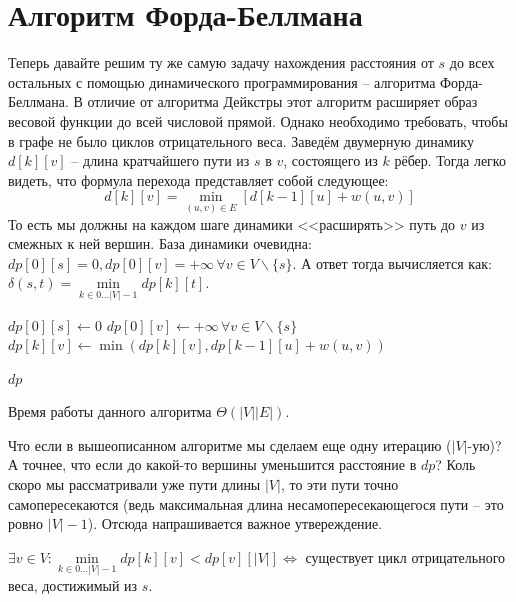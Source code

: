 \section{Алгоритм Форда-Беллмана}

Теперь давайте решим ту же самую задачу нахождения расстояния от $s$ до всех остальных с помощью динамического программирования -- алгоритма Форда-Беллмана. В отличие от алгоритма Дейкстры этот алгоритм расширяет образ весовой функции до всей числовой прямой. Однако необходимо требовать, чтобы в графе не было циклов отрицательного веса.
Заведём двумерную динамику $d[k][v]$ -- длина кратчайшего пути из $s$ в $v$, состоящего из $k$ рёбер. Тогда легко видеть, что формула перехода представляет собой следующее:
\begin{equation*}
    d[k][v] = \min\limits_{(u, v) \in E} [ d[k - 1][u] + w(u, v) ]
\end{equation*}
То есть мы должны на каждом шаге динамики <<расширять>> путь до $v$ из смежных к ней вершин. База динамики очевидна: $dp[0][s] = 0, dp[0][v] = +\infty \, \forall v \in V \backslash \{s\}$. А ответ тогда вычисляется как: $\delta(s, t) = \min\limits_{k \in 0 \dots |V| - 1} dp[k][t]$.

\begin{algorithm}[H]
\caption{Алгоритм Форда-Беллмана}
\begin{algorithmic}[1]

    \State $dp[0][s] \gets 0$
    \State $dp[0][v] \gets +\infty\, \forall v \in V \backslash \{s\}$
            \State $dp[k][v] \gets \min(dp[k][v], dp[k-1][u] + w(u, v))$
        \EndFor
    \EndFor

    \State \Return $dp$
\EndFunction
\end{algorithmic}
\end{algorithm}

Время работы данного алгоритма $\Theta(|V| |E|)$.

Что если в вышеописанном алгоритме мы сделаем еще одну итерацию ($|V|$-ую)? А точнее, что если до какой-то вершины уменьшится расстояние в $dp$? Коль скоро мы рассматривали уже пути длины $|V|$, то эти пути точно самопересекаются (ведь максимальная длина несамопересекающегося пути -- это ровно $|V| - 1$). Отсюда напрашивается важное утвереждение.


\Th $\exists v \in V: \min\limits_{k \in 0 \dots |V| - 1} dp[k][v] < dp[v][|V|] \iff$ существует цикл отрицательного веса, достижимый из $s$.

